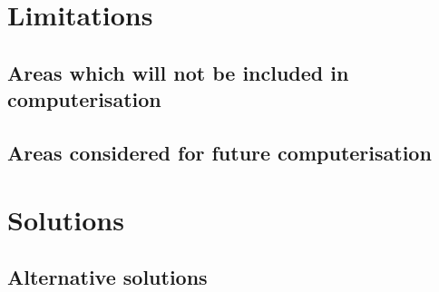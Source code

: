 \section{Limitations}

\subsection{Areas which will not be included in computerisation}



\subsection{Areas considered for future computerisation}


\pagebreak
\section{Solutions}

\subsection{Alternative solutions}

